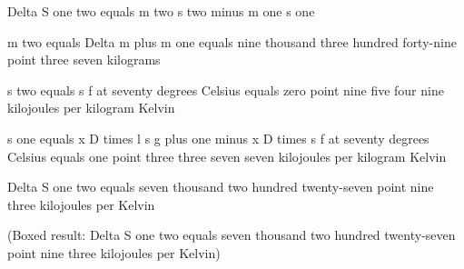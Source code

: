 Delta S one two equals m two s two minus m one s one  

m two equals Delta m plus m one equals nine thousand three hundred forty-nine point three seven kilograms  

s two equals s f at seventy degrees Celsius equals zero point nine five four nine kilojoules per kilogram Kelvin  

s one equals x D times l s g plus one minus x D times s f at seventy degrees Celsius equals one point three three seven seven kilojoules per kilogram Kelvin  

Delta S one two equals seven thousand two hundred twenty-seven point nine three kilojoules per Kelvin  

(Boxed result: Delta S one two equals seven thousand two hundred twenty-seven point nine three kilojoules per Kelvin)
